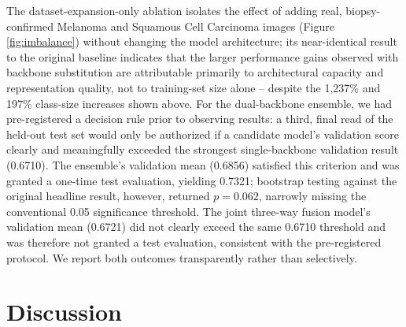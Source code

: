 \documentclass[conference]{IEEEtran}
\begin{document}
The dataset-expansion-only ablation isolates the effect of adding real, biopsy-confirmed Melanoma and Squamous Cell Carcinoma images (Figure \ref{fig:imbalance}) without changing the model architecture; its near-identical result to the original baseline indicates that the larger performance gains observed with backbone substitution are attributable primarily to architectural capacity and representation quality, not to training-set size alone -- despite the 1,237\% and 197\% class-size increases shown above. For the dual-backbone ensemble, we had pre-registered a decision rule prior to observing results: a third, final read of the held-out test set would only be authorized if a candidate model's validation score clearly and meaningfully exceeded the strongest single-backbone validation result (0.6710). The ensemble's validation mean (0.6856) satisfied this criterion and was granted a one-time test evaluation, yielding 0.7321; bootstrap testing against the original headline result, however, returned $p=0.062$, narrowly missing the conventional 0.05 significance threshold. The joint three-way fusion model's validation mean (0.6721) did not clearly exceed the same 0.6710 threshold and was therefore not granted a test evaluation, consistent with the pre-registered protocol. We report both outcomes transparently rather than selectively.

\section{Discussion}
\end{document}

